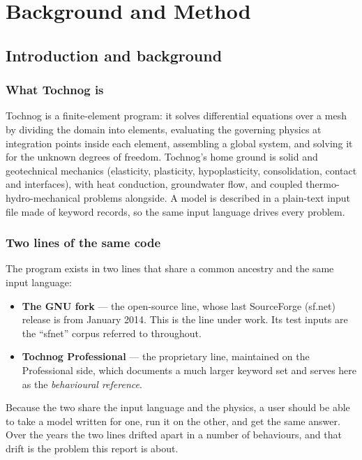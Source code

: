 \documentclass[11pt,a4paper]{report}
\begin{document}
\part{Background and Method}

\chapter{Introduction and background}
\label{ch:intro}

\section{What Tochnog is}

Tochnog is a finite-element program: it solves differential equations over a
mesh by dividing the domain into elements, evaluating the governing physics at
integration points inside each element, assembling a global system, and solving
it for the unknown degrees of freedom. Tochnog's home ground is solid and
geotechnical mechanics (elasticity, plasticity, hypoplasticity, consolidation,
contact and interfaces), with heat conduction, groundwater flow, and coupled
thermo-hydro-mechanical problems alongside. A model is described in a
plain-text input file made of keyword records, so the same input language
drives every problem.

\section{Two lines of the same code}
\label{sec:two-lines}

The program exists in two lines that share a common ancestry and the same input
language:

\begin{itemize}
  \item \textbf{The GNU fork} --- the open-source line, whose last SourceForge
        (sf.net) release is from January 2014. This is the line under work. Its
        test inputs are the ``sfnet'' corpus referred to throughout.
  \item \textbf{Tochnog Professional} --- the proprietary line, maintained on
        the Professional side, which documents a much larger keyword set and
        serves here as the \emph{behavioural reference}.
\end{itemize}

Because the two share the input language and the physics, a user should be able
to take a model written for one, run it on the other, and get the same answer.
Over the years the two lines drifted apart in a number of behaviours, and that
drift is the problem this report is about.
\end{document}

